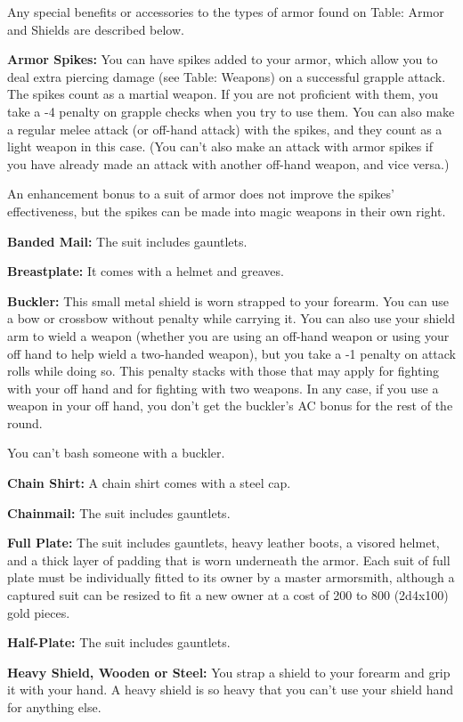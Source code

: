 Any special benefits or accessories to the types of armor found on Table: Armor 
and Shields are described below.

\textbf{Armor Spikes:} You can have spikes added to your armor, which allow you 
to deal extra piercing damage (see Table: Weapons) on a successful grapple attack. 
The spikes count as a martial weapon. If you are not proficient with them, you 
take a -4 penalty on grapple checks when you try to use them. You can also make 
a regular melee attack (or off-hand attack) with the spikes, and they count as 
a light weapon in this case. (You can't also make an attack with armor spikes if 
you have already made an attack with another off-hand weapon, and vice versa.)

An enhancement bonus to a suit of armor does not improve the spikes' effectiveness, 
but the spikes can be made into magic weapons in their own right.

\textbf{Banded Mail:} The suit includes gauntlets.

\textbf{Breastplate:} It comes with a helmet and greaves. 

\textbf{Buckler:} This small metal shield is worn strapped to your forearm. You 
can use a bow or crossbow without penalty while carrying it. You can also use your 
shield arm to wield a weapon (whether you are using an off-hand weapon or using 
your off hand to help wield a two-handed weapon), but you take a -1 penalty on 
attack rolls while doing so. This penalty stacks with those that may apply for 
fighting with your off hand and for fighting with two weapons. In any case, if 
you use a weapon in your off hand, you don't get the buckler's AC bonus for the 
rest of the round.

You can't bash someone with a buckler.

\textbf{Chain Shirt:} A chain shirt comes with a steel cap.

\textbf{Chainmail:} The suit includes gauntlets.

\textbf{Full Plate:} The suit includes gauntlets, heavy leather boots, a visored 
helmet, and a thick layer of padding that is worn underneath the armor. Each suit 
of full plate must be individually fitted to its owner by a master armorsmith, 
although a captured suit can be resized to fit a new owner at a cost of 200 to 
800 (2d4x100) gold pieces.

\textbf{Half-Plate:} The suit includes gauntlets.

\textbf{Heavy Shield, Wooden or Steel:} You strap a shield to your forearm and 
grip it with your hand. A heavy shield is so heavy that you can't use your shield 
hand for anything else.

